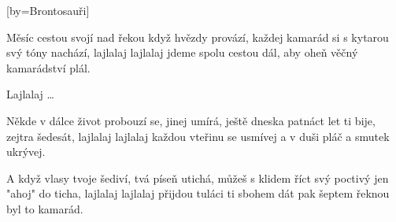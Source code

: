 [by={Brontosauři}]

\beginverse{}
Měsíc cestou svojí nad řekou když hvězdy provází,
každej kamarád si s kytarou svý tóny nachází,
lajlalaj lajlalaj
jdeme spolu cestou dál, aby oheň věčný kamarádství plál.
\endverse{}

\beginchorus{}
Lajlalaj \ldots{}        
\endchorus{}

\beginverse{}
Někde v dálce život probouzí se, jinej umírá,
ještě dneska patnáct let ti bije, zejtra šedesát,
lajlalaj lajlalaj
každou vteřinu se usmívej a v duši pláč a smutek ukrývej.
\endverse{}

\beginchorus{}
\phantom{}
\endchorus{}

\beginverse{}
A když vlasy tvoje šediví, tvá píseň utichá,
můžeš s klidem říct svý poctivý jen "ahoj" do ticha,
lajlalaj lajlalaj
přijdou tuláci ti sbohem dát pak šeptem řeknou byl to kamarád.
\endverse{}

\beginchorus{}
\phantom{}
\endchorus{}

\endsong{}
